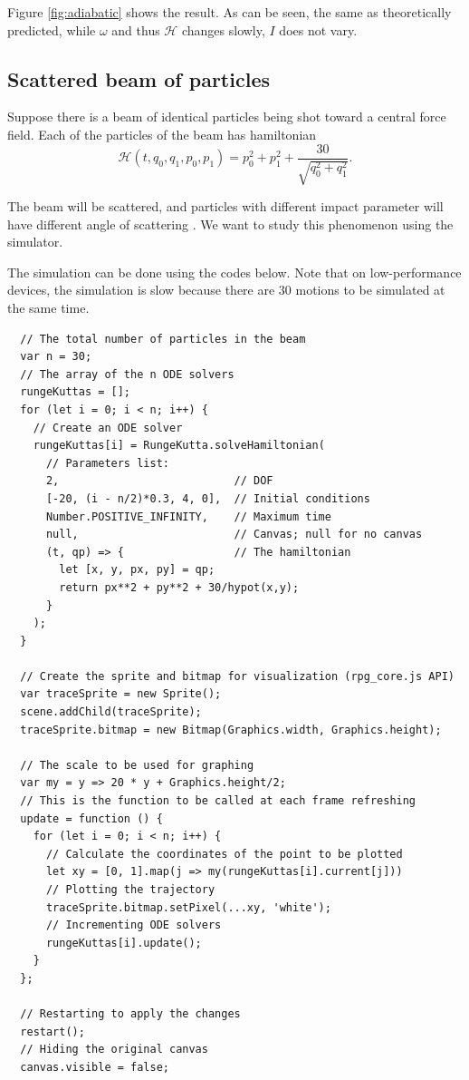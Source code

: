 \documentclass[12pt]{article}
\begin{document}
Figure \ref{fig:adiabatic} shows the result.
As can be seen, the same as theoretically predicted,
while $\omega$ and thus $\mathcal H$ changes slowly, $I$ does not vary.

\subsection{Scattered beam of particles}

Suppose there is a beam of identical particles being shot toward a central force field.
Each of the particles of the beam has hamiltonian
\begin{equation*}
  \mathcal H\left(t,q_0,q_1,p_0,p_1\right)=p_0^2+p_1^2+\frac{30}{\sqrt{q_0^2+q_1^2}}.
\end{equation*}

The beam will be scattered, and particles with different impact parameter will
have different angle of scattering \cite[p. 49]{landau1976mechanics}.
We want to study this phenomenon using the simulator.

The simulation can be done using the codes below.
Note that on low-performance devices, the simulation is slow
because there are 30 motions to be simulated at the same time.

\begin{verbatim}
  // The total number of particles in the beam
  var n = 30;
  // The array of the n ODE solvers
  rungeKuttas = [];
  for (let i = 0; i < n; i++) {
    // Create an ODE solver
    rungeKuttas[i] = RungeKutta.solveHamiltonian(
      // Parameters list:
      2,                           // DOF
      [-20, (i - n/2)*0.3, 4, 0],  // Initial conditions
      Number.POSITIVE_INFINITY,    // Maximum time
      null,                        // Canvas; null for no canvas
      (t, qp) => {                 // The hamiltonian
        let [x, y, px, py] = qp;
        return px**2 + py**2 + 30/hypot(x,y);
      }
    );
  }

  // Create the sprite and bitmap for visualization (rpg_core.js API)
  var traceSprite = new Sprite();
  scene.addChild(traceSprite);
  traceSprite.bitmap = new Bitmap(Graphics.width, Graphics.height);

  // The scale to be used for graphing
  var my = y => 20 * y + Graphics.height/2;
  // This is the function to be called at each frame refreshing
  update = function () {
    for (let i = 0; i < n; i++) {
      // Calculate the coordinates of the point to be plotted
      let xy = [0, 1].map(j => my(rungeKuttas[i].current[j]))
      // Plotting the trajectory
      traceSprite.bitmap.setPixel(...xy, 'white');
      // Incrementing ODE solvers
      rungeKuttas[i].update();
    }
  };

  // Restarting to apply the changes
  restart();
  // Hiding the original canvas
  canvas.visible = false;
\end{verbatim}
\end{document}
